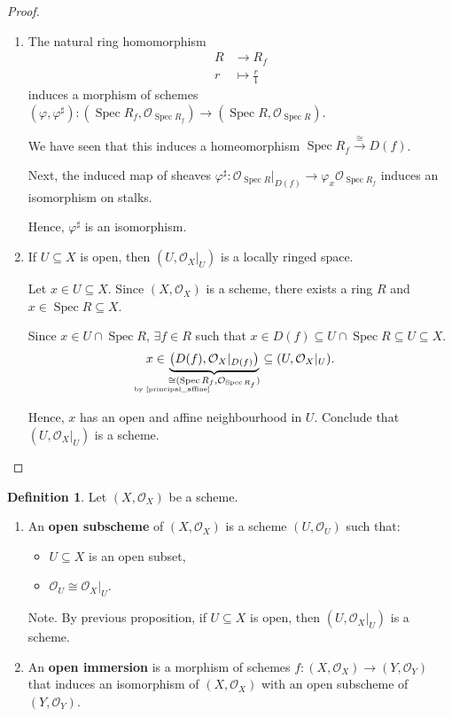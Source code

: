 \documentclass[12pt]{article}
\DeclareMathOperator{\Spec}{Spec}
\theoremstyle{definition}
\newtheorem*{definition}{Definition}
\begin{document}
\begin{proof}
\begin{enumerate}[label=\arabic*)]
\item The natural ring homomorphism
\begin{align*}
R&\longrightarrow R_f\\
r&\longmapsto\frac{r}{1}
\end{align*}
induces a morphism of schemes $(\varphi,\varphi^{\sharp}):(\Spec R_f,\mathcal{O}_{\Spec R_f})\rightarrow(\Spec R,\mathcal{O}_{\Spec R})$.

We have seen that this induces a homeomorphism $\Spec R_f\xrightarrow{\cong}D(f)$.

Next, the induced map of sheaves $\varphi^{\sharp}:\mathcal{O}_{\Spec R}|_{D(f)}\longrightarrow\varphi_x\mathcal{O}_{\Spec R_f}$ induces an isomorphism on stalks.

Hence, $\varphi^{\sharp}$ is an isomorphism.

\item If $U\subseteq X$ is open, then $(U,\mathcal{O}_X|_U)$ is a locally ringed space.

Let $x\in U\subseteq X$. Since $(X,\mathcal{O}_X)$ is a scheme, there exists a ring $R$ and $x\in\Spec R\subseteq X$.

Since $x\in U\cap\Spec R$, $\exists f\in R$ such that $x\in D(f)\subseteq U\cap\Spec R\subseteq U\subseteq X$.
\[x\in\underbrace{\big(D(f),\mathcal{O}_X|_{D(f)}\big)}_{\underset{\mathclap{\text{by \ref{principal_affine}}}}{\cong}(\Spec R_f,\mathcal{O}_{\Spec R_f})}\subseteq(U,\mathcal{O}_X|_U).\]

Hence, $x$ has an open and affine neighbourhood in $U$. Conclude that $(U,\mathcal{O}_X|_U)$ is a scheme.
\end{enumerate}
\end{proof}

\begin{definition}
Let $(X,\mathcal{O}_X)$ be a scheme.

\begin{enumerate}[label=\arabic*)]
\item An \textbf{open subscheme} of $(X,\mathcal{O}_X)$ is a scheme $(U,\mathcal{O}_U)$ such that:
\begin{itemize}[label=$-$]
\item $U\subseteq X$ is an open subset,
\item $\mathcal{O}_U\cong\mathcal{O}_X|_U$.
\end{itemize}

Note. By previous proposition, if $U\subseteq X$ is open, then $(U,\mathcal{O}_X|_U)$ is a scheme.

\item An \textbf{open immersion} is a morphism of schemes $f:(X,\mathcal{O}_X)\rightarrow(Y,\mathcal{O}_Y)$ that induces an isomorphism of $(X,\mathcal{O}_X)$ with an open subscheme of $(Y,\mathcal{O}_Y)$.
\end{enumerate}
\end{definition}
\end{document}
